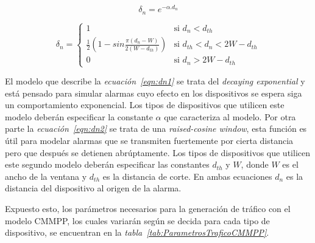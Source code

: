 \begin{equation}
\delta_n = e^{-\alpha.d_{n}}
\label{eqn:dn1}
\end{equation}

\begin{equation}
    \delta_n =
    \begin{cases}
        1  & \text{si $d_n < d_{th}$} \\
        \frac{1}{2}(1-sin\frac{\pi(d_n-W)}{2(W-d_{th})}) & \text{si $d_{th}< d_n < 2W-d_{th}$}\\
        0  & \text{si $d_n > 2W-d_{th}$}
    \end{cases}
    \label{eqn:dn2}
\end{equation}

El modelo que describe la \textit{ecuación~\ref{eqn:dn1}} se trata del \textit{decaying exponential} y está pensado para simular alarmas cuyo efecto en los dispositivos se espera siga un comportamiento exponencial. Los tipos de dispositivos que utilicen este modelo deberán especificar la constante $\alpha$ que caracteriza al modelo. Por otra parte la \textit{ecuación~\ref{eqn:dn2}} se trata de una \textit{raised-cosine window}, esta función es útil para modelar alarmas que se transmiten fuertemente por cierta distancia pero que después se detienen abrúptamente. Los tipos de dispositivos que utilicen este segundo modelo deberán especificar las constantes $d_{th}$ y $W$, donde $W$ es el ancho de la ventana y $d_{th}$ es la distancia de corte. En ambas ecuaciones $d_n$ es la distancia del dispositivo al origen de la alarma.\newline

Expuesto esto, los parámetros necesarios para la generación de tráfico con el modelo CMMPP, los cuales variarán según se decida para cada tipo de dispositivo, se encuentran en la \textit{tabla~\ref{tab:ParametrosTraficoCMMPP}}.\newline

